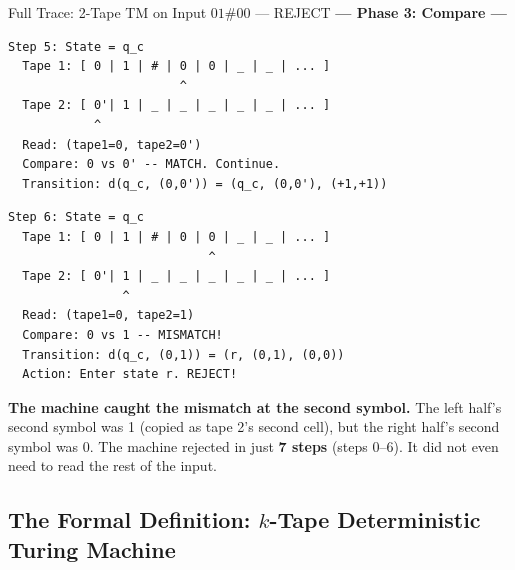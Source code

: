 \begin{examplebox}{{Full Trace: 2-Tape TM on Input $01\#00$ --- REJECT}}
\textbf{--- Phase 3: Compare ---}

\begin{lstlisting}
Step 5: State = q_c
  Tape 1: [ 0 | 1 | # | 0 | 0 | _ | _ | ... ]
                        ^
  Tape 2: [ 0'| 1 | _ | _ | _ | _ | _ | ... ]
            ^
  Read: (tape1=0, tape2=0')
  Compare: 0 vs 0' -- MATCH. Continue.
  Transition: d(q_c, (0,0')) = (q_c, (0,0'), (+1,+1))
\end{lstlisting}

\begin{lstlisting}
Step 6: State = q_c
  Tape 1: [ 0 | 1 | # | 0 | 0 | _ | _ | ... ]
                            ^
  Tape 2: [ 0'| 1 | _ | _ | _ | _ | _ | ... ]
                ^
  Read: (tape1=0, tape2=1)
  Compare: 0 vs 1 -- MISMATCH!
  Transition: d(q_c, (0,1)) = (r, (0,1), (0,0))
  Action: Enter state r. REJECT!
\end{lstlisting}

\textbf{The machine caught the mismatch at the second symbol.} The left half's second symbol was 1 (copied as tape 2's second cell), but the right half's second symbol was 0. The machine rejected in just \textbf{7 steps} (steps 0--6). It did not even need to read the rest of the input.

\end{examplebox}


\subsection{The Formal Definition: $k$-Tape Deterministic Turing Machine}

